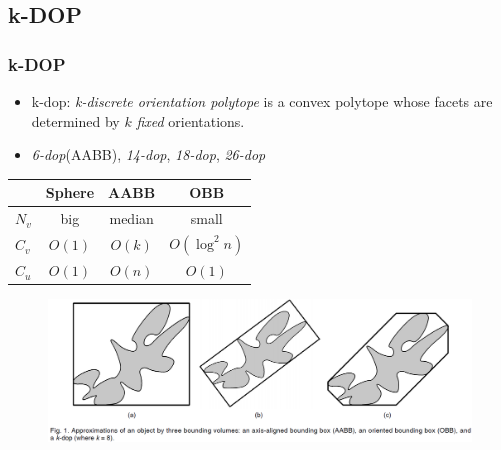 \documentclass{beamer}
\begin{document}
\subsection{k-DOP}
	\begin{frame}
	\frametitle{k-DOP}
		\begin{itemize}
			\item k-dop: {\it k-discrete orientation polytope} is a convex polytope whose facets are determined by $k$ {\it fixed} orientations.
			\item {\it 6-dop}(AABB), {\it 14-dop}, {\it 18-dop}, {\it 26-dop}
		\end{itemize}
		\begin{center}
			\begin{tabular}{l || c | c | c}
					& Sphere & AABB & OBB \\
				\hline
				$N_{v}$ & big & median & small\\ 
				$C_{v}$ & $O(1)$ & $O(k)$ & $O(\log^{2}n)$\\
				$C_{u}$ & $O(1)$ & $O(n)$ & $O(1)$\\
			\end{tabular}
		\end{center}
	\end{frame}
	
	\begin{frame}
		\begin{figure}[h!]
			\centering
			\includegraphics[width=1.0\textwidth]{./figure/kDOPs.PNG}
		\end{figure}
	\end{frame}

\end{document}
